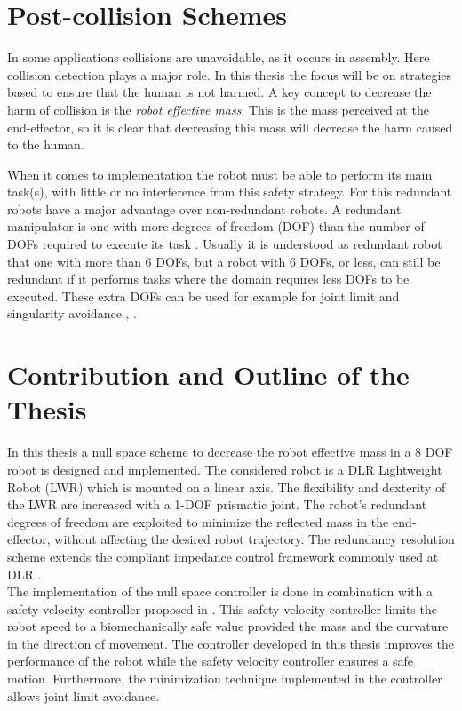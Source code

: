 \section{Post-collision Schemes}
\label{sec:decreasing_harm}

In some applications collisions are unavoidable, as it occurs in assembly. Here collision detection plays a major role. In this thesis the focus will be on strategies based to ensure that the human is not harmed. A key concept to decrease the harm of collision is the \textit{robot effective mass}. This is the mass perceived at the end-effector, so it is clear that decreasing this mass will decrease the harm caused to the human.



When it comes to implementation the  robot must be able to perform its main task(s), with little or no interference from this safety strategy.
For this redundant robots have a major advantage over non-redundant robots. 	A redundant manipulator is one with more degrees of freedom (DOF) than the number of DOFs required to execute its task \cite{redundant}. Usually it is understood as redundant robot that one with more than 6 DOFs, but a robot with 6 DOFs, or less, can still be redundant if it performs tasks where the domain requires less DOFs to be executed. These extra DOFs can be used for example for joint limit and singularity avoidance \cite{JLA_1}, \cite{redundant}.





\section{Contribution and Outline of the Thesis}
\label{sec:contribution_intro}

In this thesis a null space scheme to decrease the robot effective mass in a 8 DOF robot is designed and implemented.
The considered robot is a DLR Lightweight Robot (LWR) which is mounted on a linear axis. The flexibility and dexterity of the LWR are increased with a 1-DOF prismatic joint. The robot’s redundant degrees of freedom are exploited to minimize the reflected mass in the end-effector, without affecting the desired robot trajectory. The redundancy resolution scheme extends the compliant impedance control framework commonly used at DLR \cite{citeulike:11821616}. \\
%
The implementation of the null space controller is done in combination with a safety velocity controller proposed in \cite{sammi_paper}. This safety velocity controller limits the robot speed to a biomechanically safe value provided the mass and the curvature in the direction of movement. The controller developed in this thesis improves the performance of the robot while the safety velocity controller ensures a safe motion. Furthermore, the minimization technique implemented in the controller allows joint limit avoidance.

